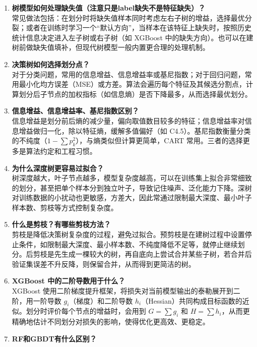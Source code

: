 \documentclass{article}
\begin{document}
\begin{enumerate}
\item \textbf{树模型如何处理缺失值（注意只是label缺失不是特征缺失）？}\\
常见做法包括：在划分时将缺失值样本同时考虑左右子树的增益，选择最优分裂；或者在训练时学习一个“默认方向”，当样本在该特征上缺失时，按照历史统计信息决定进入左子树或右子树（如 XGBoost 中的缺失方向）。也可以在建树前做缺失值填补，但现代树模型一般内置更合理的处理机制。

\item \textbf{决策树如何选择划分点？}\\
对于分类问题，常用的信息增益、信息增益率或基尼指数；对于回归问题，常用最小化均方误差（MSE）或方差。算法会遍历每个特征及其候选分割点，计算划分后子节点的加权指标（如信息熵）是否下降最多，从而选择最优划分。

\item \textbf{信息增益、信息增益率、基尼指数区别？}\\
信息增益是划分前后熵的减少量，偏向取值数目较多的特征；信息增益率对信息增益做归一化，除以特征熵，缓解多值偏好（如 C4.5）。基尼指数衡量分类的不纯度（$1-\sum p_k^2$），与熵类似但计算更简单，CART 常用。三者的选择更多是算法约定和工程习惯。

\item \textbf{为什么深度树更容易过拟合？}\\
树深度越大，叶子节点越多，模型复杂度越高，可以在训练集上拟合非常细致的划分，甚至把单个样本分到独立叶子，导致记住噪声、泛化能力下降。深树对训练数据的小扰动也更敏感，方差大，因此常通过限制最大深度、最小叶子样本数、剪枝等方式控制复杂度。

\item \textbf{什么是剪枝？有哪些剪枝方法？}\\
剪枝是降低决策树复杂度的过程，避免过拟合。预剪枝是在建树过程中设置停止条件，如限制最大深度、最小样本数、不纯度降低不足等，就停止继续划分。后剪枝是先生成一棵较大的树，再自底向上尝试合并某些子树，若合并后验证集误差不升反降，则保留合并，从而得到更简洁的树。

\item \textbf{XGBoost 中的二阶导数用于什么？}\\
XGBoost 使用二阶梯度提升框架，将损失对当前模型输出的泰勒展开到二阶，用一阶导数 $g_i$（梯度）和二阶导数 $h_i$（Hessian）共同构成目标函数的近似。划分时评价每个节点的增益时，会用到 $G=\sum g_i$ 和 $H=\sum h_i$，从而更精确地估计不同划分对损失的影响，使得优化更高效、更稳定。
\item \textbf{RF和GBDT有什么区别？}\\


\end{enumerate}
\end{document}
